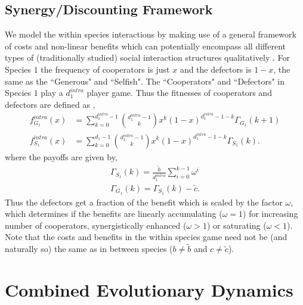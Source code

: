 \documentclass[12pt]{article}
\begin{document}
\begin{appendices}
\subsection*{Synergy/Discounting Framework}
We model the within species interactions by making use of a general framework of costs and non-linear benefits \citep{eshel:AmNat:1988,hauert:JTB:2006a} which can potentially encompass all different types of (traditionally studied) social interaction structures qualitatively \citep{nowak:book:2006}.
For Species $1$ the frequency of cooperators is just $x$ and the defectors is $1-x$, the same as the ``Generous" and ``Selfish".
The ``Cooperators" and ``Defectors" in Species $1$ play a $d_1^{intra}$ player game.
Thus the fitnesses of cooperators and defectors are defined as \citep{hauert:JTB:2006a},
%
\begin{align}
	f^{intra}_{G_1} (x) &= \sum_{k=0}^{d_1^{intra} -1} \binom{d_1^{intra} -1}{k}x^k (1-x)^{d_1^{intra} -1-k} \Gamma_{G_1}(k+1) \\
	f^{intra}_{S_1} (x) &= \sum_{k=0}^{d_1 -1} \binom{d_1^{intra} -1}{k}x^k (1-x)^{d_1^{intra} -1-k} \Gamma_{S_1}(k).
\label{intrafiteqs}
\end{align}
%
where the payoffs are given by,
\begin{align}
	\Gamma_{S_1} (k) = \frac{\tilde{b}}{d_1^{intra}} \sum_{i=0}^{k-1} \omega^i \\
	\Gamma_{G_1} (k) = \Gamma_{S_1} (k) - \tilde{c}.
\label{eqintragamepayoffs}
\end{align}
%
Thus the defectors get a fraction of the benefit which is scaled by the factor $\omega$, which determines if the benefits are linearly accumulating ($\omega=1$) for increasing number of cooperators, synergistically enhanced ($\omega>1$) or saturating ($\omega<1$).
Note that the costs and benefits in the within species game need not be (and naturally so) the same as in between species ($b\neq \tilde{b}$ and $c \neq \tilde{c}$).


\section{Combined Evolutionary Dynamics}


\end{appendices}
\end{document}
